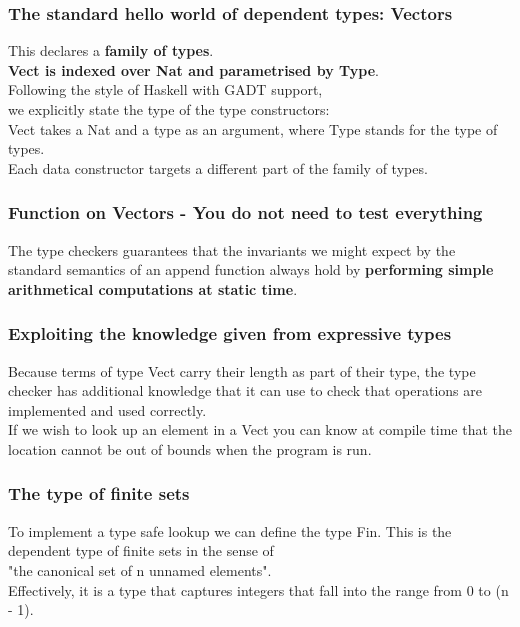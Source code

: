 \begin{frame}
\frametitle{The standard hello world of dependent types: Vectors}
\medskip
This declares a  \textbf{family of types}.\\
\textbf{Vect is indexed over Nat and parametrised by Type}.
\\ \medskip
Following the style of Haskell with GADT support,\\
we explicitly state the type of the type constructors:\\ 
Vect takes a Nat and a type as an argument, where Type stands for the type of types.\\

Each data constructor targets a different part of the family of types.\\
\end{frame}


\begin{frame}
\frametitle{Function on Vectors - You do not need to test everything}
The type checkers guarantees that the invariants we might expect by the standard semantics of an append function always hold by \textbf{performing simple arithmetical computations at static time}.\\
\end{frame}


\begin{frame}
\frametitle{Exploiting the knowledge given from expressive types}
Because terms of type Vect carry their length as part of their type, the type checker has additional knowledge that it can use to check that operations are implemented and used correctly. \\ \medskip
If we wish to look up an element in a Vect you can know at compile time that the location cannot be out of bounds when the program is run.
\end{frame}

\begin{frame}
\frametitle{The type of finite sets}
To implement a type safe lookup we can define the type Fin.
This is the dependent type of finite sets in the sense of\\ "the canonical set of n unnamed elements".\\ \medskip
Effectively, it is a type that captures integers that fall into the range from 0 to (n - 1).
\end{frame}

